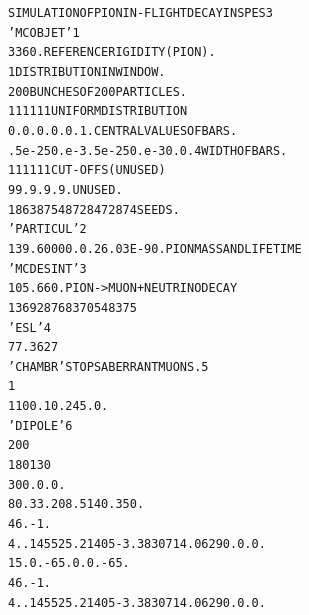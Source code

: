 \footnotesize
\begin{alltt}
  SIMULATION  OF  PION  IN-FLIGHT  DECAY  IN  SPES3                             
  'MCOBJET'                                                              1      
  3360.                                REFERENCE  RIGIDITY (PION).              
  1                                    DISTRIBUTION  IN  WINDOW.                
  200                                  BUNCHES  OF  200  PARTICLES.             
  1     1       1     1      1    1    UNIFORM DISTRIBUTION                     
  0.    0.      0.    0.     0.   1.   CENTRAL  VALUES  OF  BARS.               
  .5e-2 50.e-3 .5e-2  50.e-3 0.  0.4   WIDTH  OF  BARS.                         
  1     1       1     1      1    1    CUT-OFFS (UNUSED)                        
  9   9. 9. 9. 9.                      UNUSED.                                  
  186387 548728 472874                 SEEDS.                                   
  'PARTICUL'                                                             2      
  139.6000 0. 0. 26.03E-9 0.           PION MASS AND LIFE TIME                  
  'MCDESINT'                                                             3      
  105.66   0.                          PION -> MUON + NEUTRINODECAY             
  136928 768370 548375                                                          
  'ESL'                                                                  4      
  77.3627                                                                       
  'CHAMBR'                             STOPS  ABERRANT  MUONS.           5      
  1                                                                             
  1   100. 10. 245.  0.                                                         
  'DIPOLE'                                                               6      
  2 0 0                                                                         
  180  130                                                                      
  30     0. 0. 0.                                                               
  80.   33.     208.5  140.  350.                                               
  46. -1.                                                                       
  4. .14552 5.21405 -3.38307 14.0629 0. 0. 0.                                   
   15.   0.      -65.  0.    0.  -65.                                           
  46. -1.                                                                       
  4. .14552 5.21405 -3.38307 14.0629 0. 0. 0.                                   

\end{alltt}
